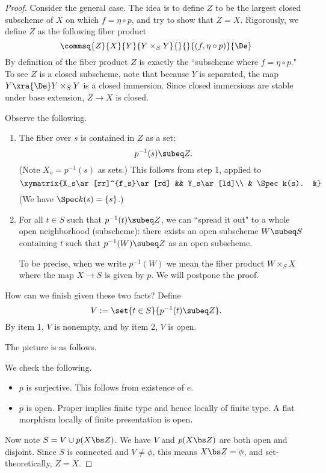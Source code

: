 \begin{proof}
Consider the general case. The idea is to define $Z$ to be the largest closed subscheme of $X$ on which $f=\eta\circ p$, and try to show that $Z=X$. Rigorously, we define $Z$ as the following fiber product
\[
\commsq{Z}{X}{Y}{Y\times_S Y}{}{}{(f,\eta\circ p)}{\De}
\]
By definition of the fiber product $Z$ is exactly the ``subscheme where $f=\eta\circ p$." To see $Z$ is a closed subscheme, note that because $Y$ is separated, the map $Y\xra{\De} Y\times_S Y$ is a closed immersion. Since closed immersions are stable under base extension, $Z\to X$ is closed.

Observe the following.
\begin{enumerate}
\item
The fiber over $s$ is contained in $Z$ as a set:
\[
p^{-1}(s)\subeq Z.
\]
(Note $X_s=p^{-1}(s)$ as sets.)
This follows from step 1, applied to 
\[
\xymatrix{X_s\ar[rr]^{f_s}\ar[rd] && Y_s\ar[ld]\\ & \Spec k(s). &}
\]
(We have $\Spec k(s)=\{s\}$.)
\item
For all $t\in S$ such that $p^{-1}(t)\subeq Z$, we can ``spread it out" to a whole open neighborhood (subscheme): there exists an open subscheme $W\subeq S$ containing $t$ such that $p^{-1}(W)\subeq Z$ as an open subscheme.

To be precise, when we write $p^{-1}(W)$ we mean the fiber product $W\times_{S} X$ where the map $X\to S$ is given by $p$.  
We will postpone the proof.
\end{enumerate}
How can we finish given these two facts? Define
\[
V:=\set{t\in S}{p^{-1}(t)\subeq Z}.
\]
By item 1, $V$ is nonempty, and by item 2, $V$ is open. 

The picture is as follows. 


We check the following.
\begin{itemize}
\item
$p$ is surjective. This follows from existence of $e$.
\item 
$p$ is open. %
Proper implies finite type and hence locally of finite type.
A flat morphism locally of finite presentation is open.
\end{itemize}
Now note $S=V\cup p(X\bs Z)$. We have $V$ and $p(X\bs Z)$ are both open and disjoint. Since $S$ is connected and $V\ne \phi$, this means $X\bs Z=\phi$, and set-theoretically, $Z=X$.


\end{proof}
